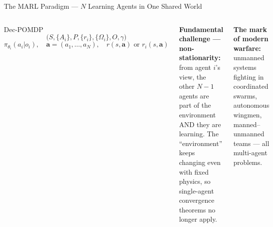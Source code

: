 \documentclass[aspectratio=169,10pt,t]{beamer}
\begin{document}
\begin{frame}{The MARL Paradigm --- $N$ Learning Agents in One Shared World}
\begin{columns}[T]
\begin{fbx}{Dec-POMDP}\[\big(S,\{A_i\},P,\{r_i\},\{\Omega_i\},O,\gamma\big)\]\[\pi_{\theta_i}(a_i|o_i),\quad \mathbf a=(a_1,\ldots,a_N),\quad r(s,\mathbf a)\text{ or }r_i(s,\mathbf a)\]\end{fbx}
\begin{wbox}\scriptsize\textbf{Fundamental challenge --- non-stationarity:} from agent $i$'s view, the other $N-1$ agents are part of the environment AND they are learning. The ``environment'' keeps changing even with fixed physics, so single-agent convergence theorems no longer apply.\end{wbox}
\begin{rbox}\scriptsize\textbf{The mark of modern warfare:} unmanned systems fighting in coordinated swarms, autonomous wingmen, manned--unmanned teams --- all multi-agent problems.\end{rbox}
\end{columns}
\end{frame}
\end{document}
